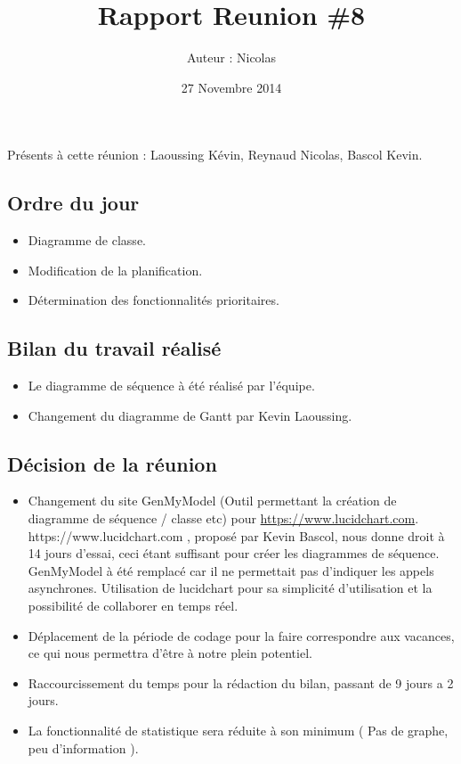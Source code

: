 \documentclass[12pt,a4paper]{article}
\title{Rapport Reunion \#8}
\author{Auteur : Nicolas \bsc{REYNAUD}}
\date{27 Novembre 2014}
\begin{document}
\maketitle

\newpage

Présents à cette réunion : Laoussing Kévin, Reynaud Nicolas, Bascol Kevin.\\


\subsection*{Ordre du jour}
\begin{itemize}[label = $\ast$]
\item Diagramme de classe.
\item Modification de la planification.
\item Détermination des fonctionnalités prioritaires.
\end{itemize}

\subsection*{Bilan du travail réalisé}

\begin{itemize}[label = $\ast$]
	\item Le diagramme de séquence à été réalisé par l'équipe.
	\item Changement du diagramme de Gantt par Kevin Laoussing.
\end{itemize}


\subsection*{Décision de la réunion}

\begin{itemize}[label = $\ast$]
	\item Changement du site GenMyModel (Outil permettant la création de diagramme de séquence / classe etc)  pour \url{https://www.lucidchart.com}.
	\subitem https://www.lucidchart.com , proposé par Kevin Bascol, nous donne droit à 14 jours d'essai, ceci étant suffisant pour créer les diagrammes de séquence.
	\subitem GenMyModel à été remplacé car il ne permettait pas d'indiquer les appels asynchrones.
	\subitem Utilisation de lucidchart pour sa simplicité d'utilisation et la possibilité de collaborer en temps réel.
	\item Déplacement de la période de codage pour la faire correspondre aux vacances, ce qui nous permettra d'être à notre plein potentiel.
	\item Raccourcissement du temps pour la rédaction du bilan, passant de 9 jours a 2 jours.
	\item La fonctionnalité de statistique sera réduite à son minimum ( Pas de graphe, peu d'information ).
\end{itemize}
\end{document}
